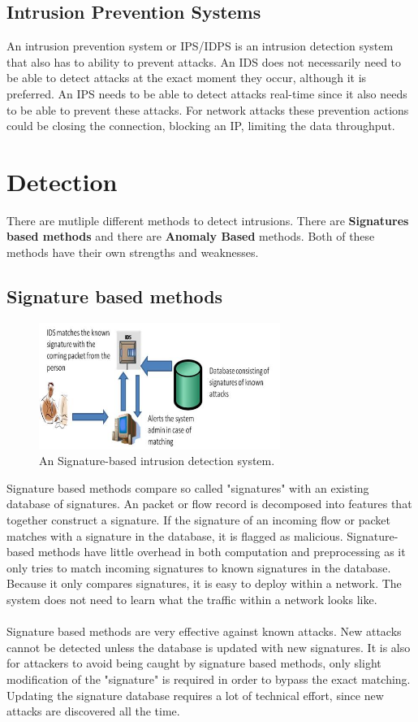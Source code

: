 \subsection{Intrusion Prevention Systems}
An intrusion prevention system or IPS/IDPS is an intrusion detection system that also has to ability to prevent attacks. An IDS does not necessarily need to be able to detect attacks at the exact moment they occur, although it is preferred. An IPS needs to be able to detect attacks real-time since it also needs to be able to prevent these attacks. For network attacks these prevention actions could be closing the connection, blocking an IP, limiting the data throughput.


\section{Detection}
There are mutliple different methods to detect intrusions. There are \textbf{Signatures based methods} and there are \textbf{Anomaly Based} methods. Both of these methods have their own strengths and weaknesses. \cite{methods}
\subsection{Signature based methods}
\begin{figure}[H]
\centering
\includegraphics[width=0.7\textwidth]{Figures/Signature-based-Intrusion-Detection-System}
\decoRule
\caption[Signature based IDS]{An Signature-based intrusion detection system.}
\label{fig:Signature}
\end{figure}
\noindent Signature based methods compare so called "signatures" with an existing database of signatures. An packet or flow record is decomposed into features that together construct a signature. If the signature of an incoming flow or packet matches with a signature in the database, it is flagged as malicious. Signature-based methods have little overhead in both computation and preprocessing as it only tries to match incoming signatures to known signatures in the database. Because it only compares signatures, it is easy to deploy within a network. The system does not need to learn what the traffic within a network looks like. \\
\\
Signature based methods are very effective against known attacks. New attacks cannot be detected unless the database is updated with new signatures. It is also for attackers to avoid being caught by signature based methods, only slight modification of the "signature" is required in order to bypass the exact matching. Updating the signature database requires a lot of technical effort, since new attacks are discovered all the time.
